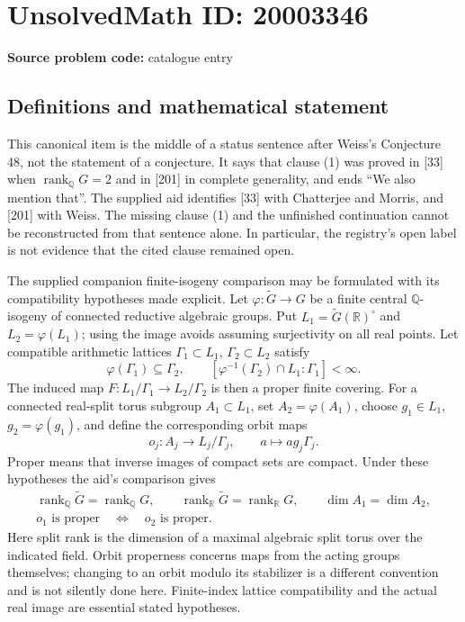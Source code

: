 \documentclass[11pt]{article}
\newcommand{\Q}{\mathbb{Q}}
\newcommand{\R}{\mathbb{R}}
\begin{document}
\section*{UnsolvedMath ID: 20003346}
\textbf{Source problem code:} catalogue entry
\subsection{Definitions and mathematical statement}
This canonical item is the middle of a status sentence after Weiss's Conjecture 48, not the statement of a conjecture. It says that clause (1) was proved in [33] when $\operatorname{rank}_{\Q}G=2$ and in [201] in complete generality, and ends ``We also mention that''. The supplied aid identifies [33] with Chatterjee and Morris, and [201] with Weiss. The missing clause (1) and the unfinished continuation cannot be reconstructed from that sentence alone. In particular, the registry's open label is not evidence that the cited clause remained open.

The supplied companion finite-isogeny comparison may be formulated with its compatibility hypotheses made explicit. Let $\varphi:\widetilde G\to G$ be a finite central $\Q$-isogeny of connected reductive algebraic groups. Put $L_1=\widetilde G(\R)^\circ$ and $L_2=\varphi(L_1)$; using the image avoids assuming surjectivity on all real points. Let compatible arithmetic lattices $\Gamma_1\subset L_1$, $\Gamma_2\subset L_2$ satisfy
\[
 \varphi(\Gamma_1)\subseteq\Gamma_2,\qquad
 [\varphi^{-1}(\Gamma_2)\cap L_1:\Gamma_1]<\infty.
\]
The induced map $F:L_1/\Gamma_1\to L_2/\Gamma_2$ is then a proper finite covering. For a connected real-split torus subgroup $A_1\subset L_1$, set $A_2=\varphi(A_1)$, choose $g_1\in L_1$, $g_2=\varphi(g_1)$, and define the corresponding orbit maps
\[
 o_j:A_j\to L_j/\Gamma_j,\qquad a\longmapsto ag_j\Gamma_j.
\]
Proper means that inverse images of compact sets are compact. Under these hypotheses the aid's comparison gives
\[
 \begin{gathered}
 \operatorname{rank}_{\Q}\widetilde G=\operatorname{rank}_{\Q}G,\qquad
 \operatorname{rank}_{\R}\widetilde G=\operatorname{rank}_{\R}G,\qquad
 \dim A_1=\dim A_2,\\
 o_1\text{ is proper}\quad\Longleftrightarrow\quad o_2\text{ is proper}.
 \end{gathered}
\]
Here split rank is the dimension of a maximal algebraic split torus over the indicated field. Orbit properness concerns maps from the acting groups themselves; changing to an orbit modulo its stabilizer is a different convention and is not silently done here. Finite-index lattice compatibility and the actual real image are essential stated hypotheses.
\end{document}
